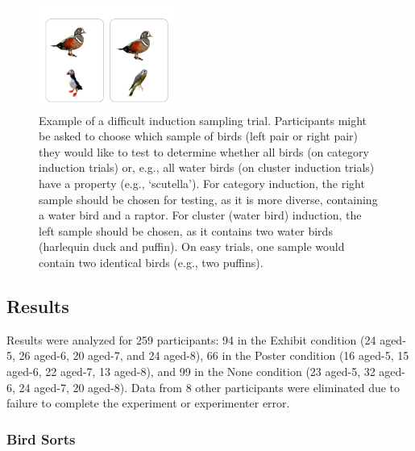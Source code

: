 \documentclass[10pt,letterpaper]{article}
\begin{document}
\begin{figure}[h]
  \centering
  \includegraphics[width=0.4\textwidth]{figures/ex_trial}
  \caption{Example of a difficult induction sampling trial. Participants might be asked to choose which sample of birds (left pair or right pair) they would like to test to determine whether all birds (on category induction trials) or, e.g., all water birds (on cluster induction trials) have a property (e.g., `scutella'). For category induction, the right sample should be chosen for testing, as it is more diverse, containing a water bird and a raptor. For cluster (water bird) induction, the left sample should be chosen, as it contains two water birds (harlequin duck and puffin). On easy trials, one sample would contain two identical birds (e.g., two puffins). }
  \label{fig:example_trial}
\end{figure} 


\subsection{Results}
Results were analyzed for 259 participants: 94 in the Exhibit condition (24 aged-5, 26 aged-6, 20 aged-7, and 24 aged-8), 66 in the Poster condition (16 aged-5, 15 aged-6, 22 aged-7, 13 aged-8), and 99 in the None condition (23 aged-5, 32 aged-6, 24 aged-7, 20 aged-8).
Data from 8 other participants were eliminated due to failure to complete the experiment or experimenter error.


\subsubsection{Bird Sorts}
\end{document}
